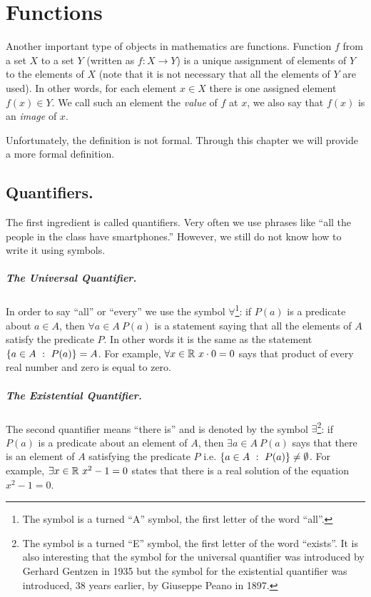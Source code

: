 \chapter{Functions}
\label{chapter:functions}

Another important type of objects in mathematics are functions. Function $f$
from a set $X$ to a set $Y$ (written as $f : X \to Y$) is a unique
assignment of elements of $Y$ to the elements of $X$ (note that it is not
necessary that all the elements of $Y$ are used). In other words, for each
element $x \in X$ there is one assigned element $f(x) \in Y$. We call such an
element the \emph{value} of $f$ at $x$, we also say that $f(x)$ is an
\emph{image} of $x$.

Unfortunately, the definition is not formal. Through this chapter we will
provide a more formal definition.

\section{Quantifiers.}
The first ingredient is called quantifiers. Very often we use phrases like ``all
the people in the class have smartphones.'' However, we still do not know how to
write it using symbols.

\paragraph{The Universal Quantifier.}
In order to say ``all'' or ``every'' we use the symbol $\forall$\footnote{%
    The symbol is a turned ``A'' symbol, the first letter of the word ``all''.
}: if $P(a)$ is a predicate about $a \in A$, then $\forall a \in A\ P(a)$ is a
statement saying that all the elements of $A$ satisfy the predicate $P$. In
other words it is the same as the statement
$\set[P(a)]{a \in A} = A$. For example, $\forall x \in \mathbb{R}\ x \cdot 0 = 0$ says
that product of every real number and zero is equal to zero.

\paragraph{The Existential Quantifier.}
The second quantifier means ``there is'' and is denoted by the symbol
$\exists$\footnote{%
    The symbol is a turned ``E'' symbol, the first letter of the word
    ``exists''. It is also interesting that the symbol for the universal
    quantifier was introduced by Gerhard Gentzen in 1935 but the symbol for the
    existential quantifier was introduced, 38 years earlier, by Giuseppe Peano
    in 1897.
}:
if $P(a)$ is a predicate about an element of $A$, then $\exists a \in A\ P(a)$
says that there is an element of $A$ satisfying the predicate $P$ i.e.
$\set[P(a)]{a \in A} \neq \emptyset$. For example,
$\exists x \in \mathbb{R}\ x^2 - 1 = 0$ states that there is a real solution of the
equation $x^2 - 1 = 0$.

